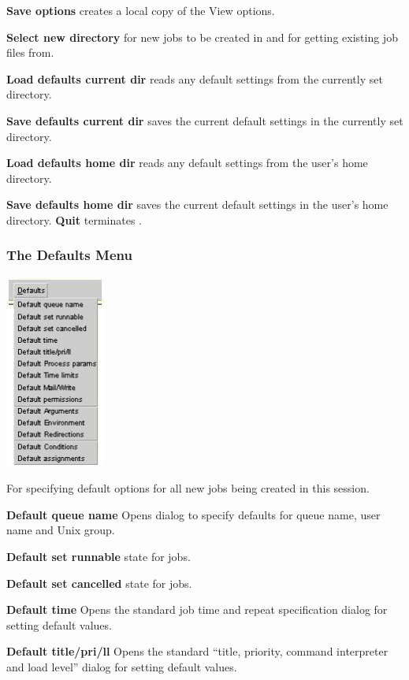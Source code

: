 \textbf{Save options} creates a local copy of the View options.

\textbf{Select new directory} for new jobs to be created in and for getting existing job files from.

\textbf{Load defaults current dir} reads any \XmbtrName{} default settings from the currently set directory.

\textbf{Save defaults current dir} saves the current \XmbtrName{} default settings in the currently set directory.

\textbf{Load defaults home dir} reads any \XmbtrName{} default settings from the user's home directory.

\textbf{Save defaults home dir} saves the current \XmbtrName{} default settings in the user's home directory. \textbf{Quit} terminates
\PrXmbtr{}.

\subsubsection[The Defaults Menu]{The Defaults Menu}
 \includegraphics[width=3.297cm,height=6.346cm]{img/ref41.jpg}

For specifying default options for all new jobs being created in this \PrXmbtr{} session.

\textbf{Default queue name} Opens dialog to specify defaults for queue
name, user name and Unix group.

\textbf{Default set runnable} state for jobs.

\textbf{Default set cancelled} state for jobs.

\textbf{Default time} Opens the standard job time and repeat
specification dialog for setting default values.

\textbf{Default title/pri/ll} Opens the standard ``title, priority, command interpreter and load level'' dialog for setting default values.

